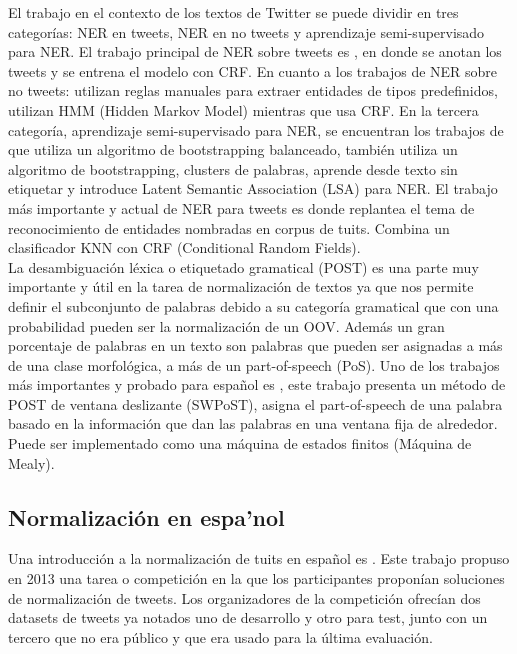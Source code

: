 \documentclass[spanish,12pt, a4paper,twoside]{paper}
\begin{document}
El trabajo en el contexto de los textos de Twitter se puede dividir en tres categorías: NER en tweets, NER en no tweets y aprendizaje semi-supervisado para NER. El trabajo principal de NER sobre tweets es \cite{finin:2010}, en donde se anotan los tweets y se entrena el modelo con CRF. En cuanto a los trabajos de NER sobre no tweets: \cite{krupkahausman:1998} utilizan reglas manuales para extraer entidades de tipos predefinidos, \cite{zhousu:2002} utilizan HMM (Hidden Markov Model) mientras que \cite{finkel:2005} usa CRF. En la tercera categoría, aprendizaje semi-supervisado para NER, se encuentran los trabajos de \cite{jiangzhai:2007} que utiliza un algoritmo de bootstrapping balanceado, \cite{wu:2009} también utiliza un algoritmo de bootstrapping, \cite{miller:2004} clusters de palabras, \cite{brown:1992} aprende desde texto sin etiquetar y \cite{guo:2009} introduce Latent Semantic Association (LSA) para NER. El trabajo más importante y actual de NER para tweets es \cite{liu:2011} donde replantea el tema de reconocimiento de entidades nombradas en corpus de tuits. Combina un clasificador KNN con CRF (Conditional Random Fields).\\

La desambiguación léxica o etiquetado gramatical (POST) es una parte muy importante y útil en la tarea de normalización de textos ya que nos permite definir el subconjunto de palabras debido a su categoría gramatical que con una probabilidad pueden ser la normalización de un OOV. Además un gran porcentaje de palabras en un texto son palabras que pueden ser asignadas a más de una clase morfológica, a más de un part-of-speech (PoS). Uno de los trabajos más importantes y probado para español es \cite{sanchezforcada:2004}, este trabajo presenta un método de POST de ventana deslizante (SWPoST), asigna el part-of-speech de una palabra basado en la información que dan las palabras en una ventana fija de alrededor. Puede ser implementado como una máquina de estados finitos (Máquina de Mealy).


\subsection{Normalización en espa'nol}\label{sec:normalzacionenespanol}
Una introducción a la normalización de tuits en español es \cite{alegria:2013}\cite{alegria:2015}. Este trabajo propuso en 2013 una tarea o competición en la que los participantes proponían soluciones de normalización de tweets. Los organizadores de la competición ofrecían dos datasets de tweets ya notados uno de desarrollo y otro para test, junto con un tercero que no era público y que era usado para la última evaluación.\\
\end{document}
